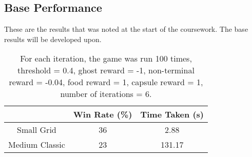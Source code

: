 \documentclass[12pt]{report}
\begin{document}
      \subsection*{Base Performance}
      These are the results that was noted at the start of the coursework. The base results will be developed upon.
        \begin{table}[H]
          \begin{center}
            \begin{adjustbox}{max width=\textwidth}
            \begin{tabular}{*{3}{c}}

              \textbf{} & \textbf{Win Rate (\%)} & \textbf{Time Taken (s)}\\
              \hline
                    Small Grid & 36 & 2.88 \\
                    Medium Classic & 23 & 131.17 \\

            \end{tabular}
            \end{adjustbox}
            \caption{For each iteration, the game was run 100 times, threshold = 0.4, ghost reward = -1, non-terminal reward = -0.04, food reward = 1, capsule reward = 1, number of iterations = 6.}
            \label{tab:table4}
          \end{center}
        \end{table}
        \vspace{-5mm}
\end{document}
